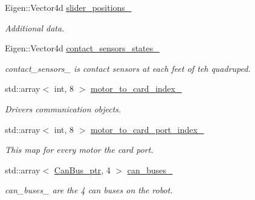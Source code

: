 \begin{DoxyCompactItemize}
Eigen\+::\+Vector4d \hyperlink{classblmc__robots_1_1Solo8TI_ac81e772bd951a26989c1b9108eccecec}{slider\+\_\+positions\+\_\+}
\begin{DoxyCompactList}\small\item\em Additional data. \end{DoxyCompactList}\item 
\mbox{\label{classblmc__robots_1_1Solo8TI_a0890fcba8970fa8d9a3442ff8f4c9015}} 
Eigen\+::\+Vector4d \hyperlink{classblmc__robots_1_1Solo8TI_a0890fcba8970fa8d9a3442ff8f4c9015}{contact\+\_\+sensors\+\_\+states\+\_\+}
\begin{DoxyCompactList}\small\item\em contact\+\_\+sensors\+\_\+ is contact sensors at each feet of teh quadruped. \end{DoxyCompactList}\item 
std\+::array$<$ int, 8 $>$ \hyperlink{classblmc__robots_1_1Solo8TI_a1287fd44d615eec9d3333f186adb18ec}{motor\+\_\+to\+\_\+card\+\_\+index\+\_\+}
\begin{DoxyCompactList}\small\item\em Drivers communication objects. \end{DoxyCompactList}\item 
\mbox{\label{classblmc__robots_1_1Solo8TI_ae85c5b55fc3ac22ab6d28533f544fff5}} 
std\+::array$<$ int, 8 $>$ \hyperlink{classblmc__robots_1_1Solo8TI_ae85c5b55fc3ac22ab6d28533f544fff5}{motor\+\_\+to\+\_\+card\+\_\+port\+\_\+index\+\_\+}
\begin{DoxyCompactList}\small\item\em This map for every motor the card port. \end{DoxyCompactList}\item 
\mbox{\label{classblmc__robots_1_1Solo8TI_a1dc6570d3d386a8f955ca83566dc2f9b}} 
std\+::array$<$ \hyperlink{common__header_8hpp_a793c8789a7598e8aaf766939da7262af}{Can\+Bus\+\_\+ptr}, 4 $>$ \hyperlink{classblmc__robots_1_1Solo8TI_a1dc6570d3d386a8f955ca83566dc2f9b}{can\+\_\+buses\+\_\+}
\begin{DoxyCompactList}\small\item\em can\+\_\+buses\+\_\+ are the 4 can buses on the robot. \end{DoxyCompactList}\item 
\mbox{\label{classblmc__robots_1_1Solo8TI_aa436a497b597b05b0733430ea5c2f251}} 

\end{DoxyCompactItemize}
